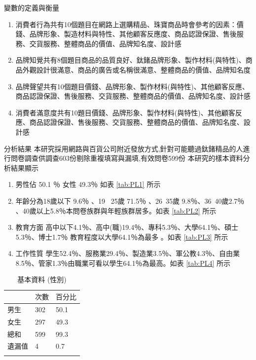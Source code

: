 變數的定義與衡量
\begin{enumerate}
\item  消費者行為共有10個題目在網路上選購精品、珠寶商品時會參考的因素：價錢、品牌形象、製造材料與特性、其他顧客反應度、商品認證保證、售後服務、交貨服務、整體商品的價值、品牌知名度、設計感
\item 品牌知覺共有8個題目商品的品質良好、鈦鍺品牌形象、製作材料(與特性)、商品外觀設計很滿意、商品的廣告或名稱很滿意、整體商品的價值、品牌知名度
\item 品牌聲望共有10個題目價錢、品牌形象、製作材料(與特性)、其他顧客反應、商品認證保證、售後服務、交貨服務、整體商品的價值、品牌知名度、設計感
\item 消費者滿意度共有10題目價錢、品牌形象、製作材料(與特性)、其他顧客反應、商品認證保證、售後服務、交貨服務、整體商品的價值、品牌知名度、設計感
\end{enumerate}
分析結果
本研究採用網路與百貨公司附近發放方式,針對可能聽過鈦鍺精品的人進行問卷調查供調查603份剔除重複填寫與漏填,有效問卷599份 
本研究的樣本資料分析結果顯示 
\begin{enumerate}
\item 男性佔 50.1 ％ 女性 49.3％ 如表 \ref{tab:PL1} 所示 
\item 年齡分為18歲以下 9.6％ 、19 ~25歲 71.5％ 、26~35歲 9.8％、36~40歲2.7％ 、40歲以上5.8％本問卷族群與年輕族群居多。如表  \ref{tab:PL2} 所示
\item 教育方面 高中以下4.1％、高中(職)19.4％、專科5.3％、大學64.1％、碩士5.3％、博士1.7％ 教育程度以大學64.1％為最多 。如表 \ref{tab:PL3} 所示
\item 工作性質 學生52.4％、服務業29.4％、製造業3.5％、軍公教4.3％、自由業8.5％、管家1.3％由職業可看以學生64.1％為最高。如表 \ref{tab:PL4} 所示
\end{enumerate}

\begin{table}[htb]
\caption{基本資料 (性別)}
\label{tab:PL1}
\renewcommand{\arraystretch}{1.2} %
\arrayrulewidth=1pt               %
\tabcolsep=24pt                   %
%
\begin{tabular}[t]{lll}  %
\hline
 & $次數$ & $百分比$ \\
\hline
男生        & 302 & 50.1 \\
女生        & 297  & 49.3 \\
總和        & 599  & 99.3 \\
遺漏值            & 4 & 0.7 \\
\hline
\centering
\label{fig:PL4}
\end{tabular}
\end{table}

